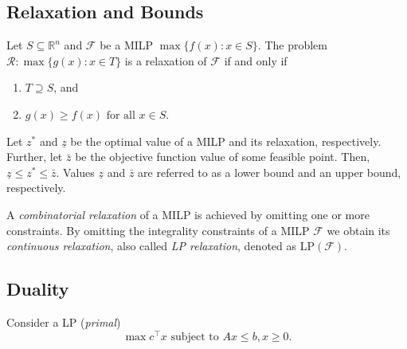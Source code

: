\subsection{Relaxation and Bounds}

\begin{definition}
	Let $S\subseteq \mathbb{R}^n$ and $\mathcal{F}$ be a MILP $\max\{f(x):x\in S\}$.
	The problem $\mathcal{R}: \max\{g(x):x\in T\}$ is a relaxation of $\mathcal{F}$ if and only if
	\begin{enumerate}
		\item $T\supseteq S$, and
		\item $g(x)\geq f(x) \text{ for all } x\in S$.
	\end{enumerate}
\end{definition}


Let $z^*$ and $\underline{z}$ be the optimal value of a MILP and its relaxation, respectively. 
Further, let $\bar{z}$ be the objective function value of some feasible point.
Then, $\underline{z}\leq z^* \leq \bar{z}$.
Values $\underline{z}$ and $\bar{z}$ are referred to as a lower bound and an upper bound, respectively.

A \emph{combinatorial relaxation} of a MILP is achieved by omitting one or more constraints. 
By omitting the integrality constraints of a MILP $\mathcal{F}$ we obtain its \emph{continuous relaxation}, also called \emph{LP relaxation}, denoted as LP$(\mathcal{F})$.

\subsection{Duality}

Consider a LP (\emph{primal})
\begin{equation}
	\max c^\top x   
	\text{ subject to } 
	  Ax \leq b, 
	  x   \geq 0. 
\label{eq:primal}
\end{equation}

